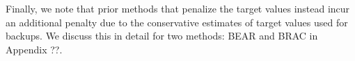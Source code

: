 Finally, we note that prior methods that penalize the target values instead incur an additional penalty due to the conservative estimates of target values used for backups. We discuss this in detail for two methods: BEAR and BRAC in Appendix ??.

